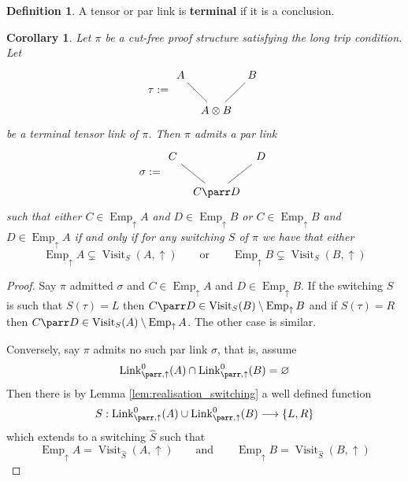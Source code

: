 \documentclass[12pt]{article}
\theoremstyle{plain}
\newtheorem{cor}[thm]{Corollary}
\theoremstyle{definition}
\newtheorem{defn}[thm]{Definition} %
\newcommand{\lto}{\longrightarrow}
\begin{document}
	\begin{defn}
		A tensor or par link is \textbf{terminal} if it is a conclusion.
	\end{defn}
	\begin{cor}\label{lem:par_link_existence}
		Let $\pi$ be a cut-free proof structure satisfying the long trip condition. Let
		\[
		\tau := \begin{tikzcd}[column sep = tiny]
			A\arrow[dr,dash] && B\arrow[dl,dash]\\
			& A \otimes B
		\end{tikzcd}
		\]
		be a terminal tensor link of $\pi$. Then $\pi$ admits a par link
		\[
		\sigma := \begin{tikzcd}[column sep = tiny]
			C\arrow[dr,dash] && D\arrow[dl,dash]\\
			& C \parr D
		\end{tikzcd}
		\]
		such that either $C \in \operatorname{Emp}_{\uparrow}A$ and $D \in \operatorname{Emp}_{\uparrow}B$ or $C \in \operatorname{Emp}_{\uparrow}B$ and $D \in \operatorname{Emp}_{\uparrow}A$ if and only if for any switching $S$ of $\pi$ we have that either
		\[\operatorname{Emp}_{\uparrow}A \subsetneq \operatorname{Visit}_S(A,\uparrow)\qquad\text{or}\qquad \operatorname{Emp}_{\uparrow}B \subsetneq \operatorname{Visit}_S(B,\uparrow)\]
	\end{cor}
	\begin{proof}
		Say $\pi$ admitted $\sigma$ and $C \in \operatorname{Emp}_{\uparrow}A$ and $D \in \operatorname{Emp}_{\uparrow}B$. If the switching $S$ is such that $S(\tau) = L$ then $C \parr D \in \operatorname{Visit}_S(B)\setminus \operatorname{Emp}_{\uparrow}B$ and if $S(\tau) = R$ then $C \parr D \in \operatorname{Visit}_S(A) \setminus \operatorname{Emp}_{\uparrow}A$. The other case is similar.
		
		Conversely, say $\pi$ admits no such par link $\sigma$, that is, assume
		\begin{equation}
			\operatorname{Link}^0_{\parr,\uparrow}(A) \cap \operatorname{Link}^0_{\parr,\uparrow}(B) = \varnothing
		\end{equation}
		Then there is by Lemma \ref{lem:realisation_switching} a well defined function $$S: \operatorname{Link}_{\parr,\uparrow}^0(A) \cup \operatorname{Link}^0_{\parr,\uparrow}(B) \lto \lbrace L, R \rbrace$$ which extends to a switching $\hat{S}$ such that
		\begin{equation}
			\operatorname{Emp}_{\uparrow}A = \operatorname{Visit}_{\hat{S}}(A,\uparrow)\qquad\text{and}\qquad \operatorname{Emp}_{\uparrow}B = \operatorname{Visit}_{\hat{S}}(B,\uparrow)
		\end{equation}
	\end{proof}
	
\end{document}
